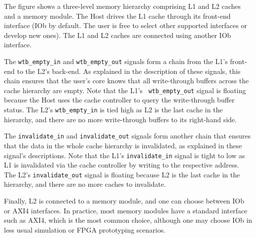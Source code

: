 %

The figure shows a three-level memory hierarchy comprising L1 and L2 caches and
a memory module. The Host drives the L1 cache through its front-end interface 
(IOb by default. The user is free to select other supported interfaces or develop new ones).
The L1 and L2 caches are connected using another IOb interface.

The {\tt wtb\_empty\_in} and {\tt wtb\_empty\_out} signals form a chain from the
L1's front-end to the L2's back-end. As explained in the description of these
signals, this chain ensures that the user's core knows that all write-through
buffers across the cache hierarchy are empty. Note that the L1's {\tt
  wtb\_empty\_out} signal is floating because the Host uses the cache controller
to query the write-through buffer status. The L2's {\tt wtb\_empty\_in} is tied
high as L2 is the last cache in the hierarchy, and there are no more
write-through buffers to its right-hand side.

The {\tt invalidate\_in} and {\tt invalidate\_out} signals form another chain that
ensures that the data in the whole cache hierarchy is invalidated, as explained
in these signal's descriptions. Note that the L1's {\tt invalidate\_in} signal is
tight to low as L1 is invalidated via the cache controller by writing to the
respective address. The L2's {\tt invalidate\_out} signal is floating because L2
is the last cache in the hierarchy, and there are no more caches to invalidate.

Finally, L2 is connected to a memory module, and one can choose between IOb or
AXI4 interfaces. In practice, most memory modules have a standard interface such
as AXI4, which is the most common choice, although one may choose IOb in less
usual simulation or FPGA prototyping scenarios.

